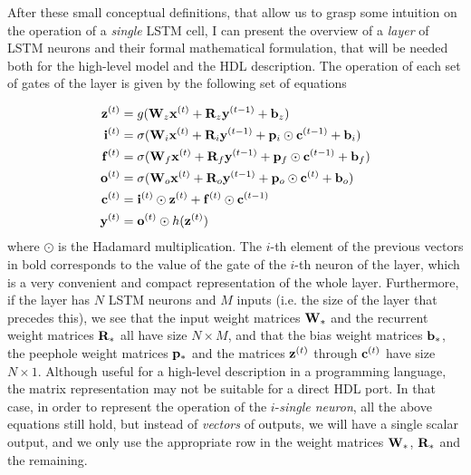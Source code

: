 After these small conceptual definitions, that allow us to grasp some intuition on the operation of a \textit{single} LSTM cell, I can present the overview of a \textit{layer} of LSTM neurons and their formal mathematical formulation, that will be needed both for the high-level model and the HDL description. The operation of each set of gates of the layer is given by the following set of equations

\begin{align}
    \mathbf{z}^{(t)} & = g(\mathbf{W}_z \mathbf{x}^{(t)} + \mathbf{R}_z \mathbf{y}^{(t-1)} + \mathbf{b}_z) \notag\\
    \mathbf{i}^{(t)} & = \sigma(\mathbf{W}_i \mathbf{x}^{(t)} + \mathbf{R}_i \mathbf{y}^{(t-1)} + \mathbf{p}_i \odot \mathbf{c}^{(t-1)} + \mathbf{b}_i) \notag\\
    \mathbf{f}^{(t)} & = \sigma(\mathbf{W}_f \mathbf{x}^{(t)} + \mathbf{R}_f \mathbf{y}^{(t-1)} + \mathbf{p}_f \odot \mathbf{c}^{(t-1)} + \mathbf{b}_f) \notag\\
    \mathbf{o}^{(t)} & = \sigma(\mathbf{W}_o \mathbf{x}^{(t)} + \mathbf{R}_o \mathbf{y}^{(t-1)} + \mathbf{p}_o \odot \mathbf{c}^{(t)} + \mathbf{b}_o) \notag\\
    \mathbf{c}^{(t)} & = \mathbf{i}^{(t)} \odot \mathbf{z}^{(t)} + \mathbf{f}^{(t)} \odot \mathbf{c}^{(t-1)} \notag \\
    \mathbf{y}^{(t)} & = \mathbf{o}^{(t)} \odot h(\mathbf{z}^{(t)}) \label{eq:equationsLSTM}
\end{align}
where $\odot$ is the Hadamard multiplication. The $i$-th element of the previous vectors in bold corresponds to the value of the gate of the $i$-th neuron of the layer, which is a very convenient and compact representation of the whole layer. Furthermore, if the layer has $N$ LSTM neurons and $M$ inputs (i.e. the size of the layer that precedes this), we see that the input weight matrices $\mathbf{W}_*$ and the  recurrent weight matrices $\mathbf{R}_*$ all have size $N \times M$, and that the bias weight matrices $\mathbf{b}_*$, the peephole weight matrices $\mathbf{p}_*$ and the matrices $\mathbf{z}^{(t)}$ through $\mathbf{c}^{(t)}$ have size $N \times 1$. Although useful for a high-level description in a programming language, the matrix representation  may not be suitable for a direct HDL port. In that case, in order to represent the operation of the $i$-\textit{single neuron}, all the above equations still hold, but instead of \textit{vectors} of outputs, we will have a single scalar output, and we only use the appropriate row in the weight matrices $\mathbf{W}_{*}$, $\mathbf{R}_{*}$ and the remaining.

